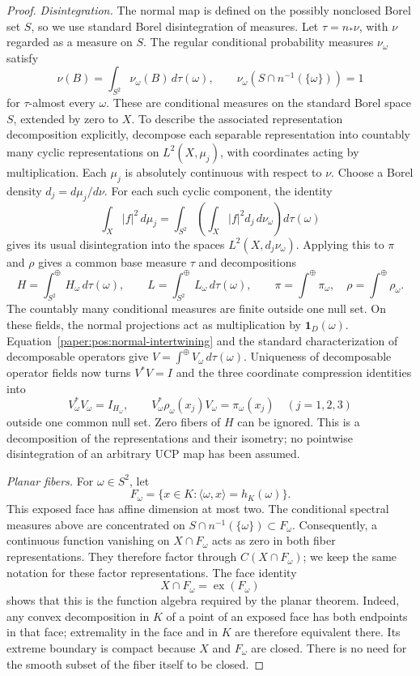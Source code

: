 \documentclass[11pt,letterpaper]{amsart}
\theoremstyle{definition}
\theoremstyle{remark}
\numberwithin{equation}{section}
\DeclareMathOperator{\ex}{ex}
\begin{document}
\begin{proof}
\emph{Disintegration.}
The normal map is defined on the possibly nonclosed Borel set $S$,
so we use standard Borel disintegration of measures. Let
$\tau=n_*\nu$, with $\nu$ regarded as a measure on $S$.
The regular conditional probability measures $\nu_\omega$ satisfy
\[
 \nu(B)=\int_{S^2}\nu_\omega(B)\,d\tau(\omega),\qquad
 \nu_\omega(S\cap n^{-1}(\{\omega\}))=1
\]
for $\tau$-almost every $\omega$. These are conditional measures on
the standard Borel space $S$, extended by zero to $X$.
To describe the associated representation decomposition
explicitly, decompose each separable representation into
countably many cyclic representations on
$L^2(X,\mu_j)$, with coordinates acting by multiplication.
Each $\mu_j$ is absolutely continuous with respect to
$\nu$. Choose a Borel density $d_j=d\mu_j/d\nu$.
For each such cyclic component, the identity
\[
 \int_X|f|^2\,d\mu_j
 =\int_{S^2}\!\left(\int_X|f|^2d_j\,d\nu_\omega\right)
       d\tau(\omega)
\]
gives its usual disintegration into the spaces
$L^2(X,d_j\nu_\omega)$. Applying this to $\pi$ and $\rho$
gives a common base measure $\tau$ and decompositions
\[
 H=\int_{S^2}^{\oplus}H_\omega\,d\tau(\omega),\qquad
 L=\int_{S^2}^{\oplus}L_\omega\,d\tau(\omega),
 \qquad
 \pi=\int^{\oplus}\pi_\omega,\quad
 \rho=\int^{\oplus}\rho_\omega.
\]
The countably many conditional measures are finite outside
one null set. On these fields, the normal projections act
as multiplication by $\mathbf 1_D(\omega)$.
Equation~\eqref{paper:pos:normal-intertwining} and the
standard characterization of decomposable operators give
$V=\int^{\oplus}V_\omega\,d\tau(\omega)$.
Uniqueness of decomposable operator fields now turns $V^*V=I$ and
the three coordinate compression identities into
\[
 V_\omega^*V_\omega=I_{H_\omega},\qquad
 V_\omega^*\rho_\omega(x_j)V_\omega=\pi_\omega(x_j)
 \quad(j=1,2,3)
\]
outside one common null set. Zero fibers of $H$ can be ignored.
This is a decomposition of the representations and their isometry;
no pointwise disintegration of an arbitrary UCP map has been assumed.

\emph{Planar fibers.}
For $\omega\in S^2$, let
\[
 F_\omega=\{x\in K:
                 \langle\omega,x\rangle=h_K(\omega)\}.
\]
This exposed face has affine dimension at most two.
The conditional spectral measures above are concentrated
on $S\cap n^{-1}(\{\omega\})\subset F_\omega$.
Consequently, a continuous function vanishing on $X\cap F_\omega$
acts as zero in both fiber representations. They therefore factor
through $C(X\cap F_\omega)$; we keep the same notation for these
factor representations. The face identity
\[
                    X\cap F_\omega=\ex(F_\omega)
\]
shows that this is the function algebra required by the planar
theorem. Indeed, any convex decomposition in $K$ of a point of an
exposed face has both endpoints in that face; extremality in the face
and in $K$ are therefore equivalent there. Its extreme boundary is
compact because
$X$ and $F_\omega$ are closed. There is no need for the
smooth subset of the fiber itself to be closed.


\end{proof}
\end{document}
